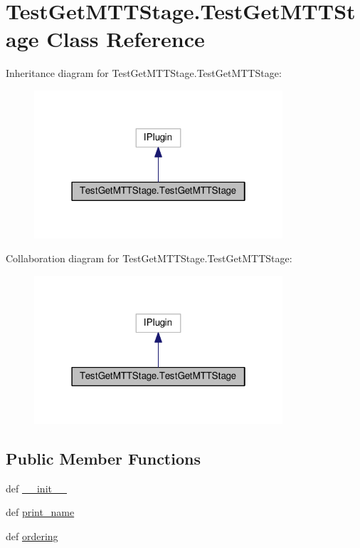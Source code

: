 \hypertarget{classTestGetMTTStage_1_1TestGetMTTStage}{\section{Test\-Get\-M\-T\-T\-Stage.\-Test\-Get\-M\-T\-T\-Stage Class Reference}
\label{classTestGetMTTStage_1_1TestGetMTTStage}
}


Inheritance diagram for Test\-Get\-M\-T\-T\-Stage.\-Test\-Get\-M\-T\-T\-Stage\-:
\nopagebreak
\begin{figure}[H]
\begin{center}
\leavevmode
\includegraphics[width=262pt]{classTestGetMTTStage_1_1TestGetMTTStage__inherit__graph}
\end{center}
\end{figure}


Collaboration diagram for Test\-Get\-M\-T\-T\-Stage.\-Test\-Get\-M\-T\-T\-Stage\-:
\nopagebreak
\begin{figure}[H]
\begin{center}
\leavevmode
\includegraphics[width=262pt]{classTestGetMTTStage_1_1TestGetMTTStage__coll__graph}
\end{center}
\end{figure}
\subsection*{Public Member Functions}
\begin{DoxyCompactItemize}
\item 
def \hyperlink{classTestGetMTTStage_1_1TestGetMTTStage_adcada621115f6b12cdc9b0949da5e969}{\-\_\-\-\_\-init\-\_\-\-\_\-}
\item 
def \hyperlink{classTestGetMTTStage_1_1TestGetMTTStage_a6082004f762323aea42aab7c638066de}{print\-\_\-name}
\item 
def \hyperlink{classTestGetMTTStage_1_1TestGetMTTStage_a41143acbbabbc2b3990ed1cff8101907}{ordering}
\end{DoxyCompactItemize}


